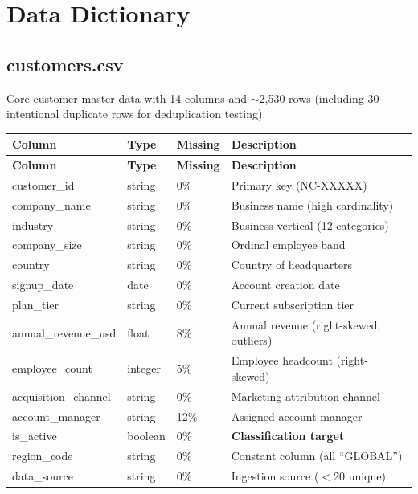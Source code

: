 \documentclass[11pt,a4paper]{article}
\begin{document}
\section{Data Dictionary}

\subsection{customers.csv}

Core customer master data with 14 columns and $\sim$2,530 rows (including 30
intentional duplicate rows for deduplication testing).

\begin{center}
\begin{longtable}{lllp{5.5cm}}
    \toprule
    \textbf{Column} & \textbf{Type} & \textbf{Missing} & \textbf{Description} \\
    \midrule
    \endfirsthead
    \toprule
    \textbf{Column} & \textbf{Type} & \textbf{Missing} & \textbf{Description} \\
    \midrule
    \endhead
    customer\_id          & string  & 0\%  & Primary key (NC-XXXXX) \\
    company\_name         & string  & 0\%  & Business name (high cardinality) \\
    industry              & string  & 0\%  & Business vertical (12 categories) \\
    company\_size         & string  & 0\%  & Ordinal employee band \\
    country               & string  & 0\%  & Country of headquarters \\
    signup\_date          & date    & 0\%  & Account creation date \\
    plan\_tier            & string  & 0\%  & Current subscription tier \\
    annual\_revenue\_usd  & float   & 8\%  & Annual revenue (right-skewed, outliers) \\
    employee\_count       & integer & 5\%  & Employee headcount (right-skewed) \\
    acquisition\_channel  & string  & 0\%  & Marketing attribution channel \\
    account\_manager      & string  & 12\% & Assigned account manager \\
    is\_active            & boolean & 0\%  & \textbf{Classification target} \\
    region\_code          & string  & 0\%  & Constant column (all ``GLOBAL'') \\
    data\_source          & string  & 0\%  & Ingestion source ($<$20 unique) \\
    \bottomrule
\end{longtable}
\end{center}
\end{document}
